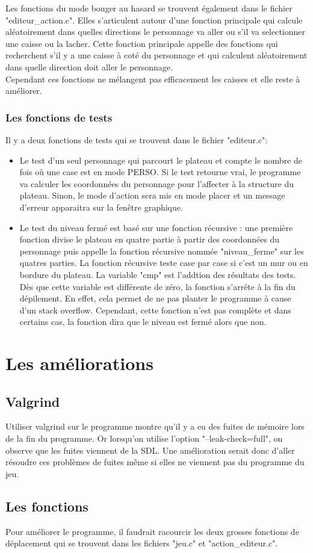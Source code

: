 \documentclass{report}
\begin{document}
Les fonctions du mode bouger au hasard se trouvent également dans le fichier "editeur\_action.c". Elles s'articulent autour d'une fonction principale qui calcule aléatoirement dans quelles directions le personnage va aller ou s'il va selectionner une caisse ou la lacher.
Cette fonction principale appelle des fonctions qui recherchent s'il y a une caisse à coté du personnage et qui calculent aléatoirement dans quelle direction doit aller le personnage.\\
Cependant ces fonctions ne mélangent pas efficacement les caisses et elle reste à améliorer.

		\section{Les fonctions de tests}
Il y a deux fonctions de tests qui se trouvent dans le fichier "editeur.c":\\
\begin{itemize}
\item Le test d'un seul personnage qui parcourt le plateau et compte le nombre de fois où une case est en mode PERSO. Si le test retourne vrai, le programme va calculer les coordonnées du personnage pour l'affecter à la structure du plateau. Sinon, le mode d'action sera mis en mode placer et un message d'erreur apparaitra sur la fenêtre graphique.
\item Le test du niveau fermé est basé sur une fonction récursive : une première fonction divise le plateau en quatre partie à partir des coordonnées du personnage puis appelle la fonction récursive nommée "niveau\_ferme" sur les quatres parties.
La fonction récursive teste case par case si c'est un mur ou en bordure du plateau. La variable "cmp" est l'addtion des résultats des tests. Dès que cette variable est différente de zéro, la fonction s'arrête à la fin du dépilement. En effet, cela permet de ne pas planter le programme à cause d'un stack overflow.
Cependant, cette fonction n'est pas complète et dans certains cas, la fonction dira que le niveau est fermé alors que non.
\end{itemize}

\part{Les améliorations}
	\chapter{Valgrind}
Utiliser valgrind sur le programme montre qu'il y a eu des fuites de mémoire lors de la fin du programme. Or lorsqu'on utilise l'option "--leak-check=full", on observe que les fuites viennent de la SDL. 
Une amélioration serait donc d'aller résoudre ces problèmes de fuites même si elles ne viennent pas du programme du jeu. 
	\chapter{Les fonctions}
Pour améliorer le programme, il faudrait racourcir les deux grosses fonctions de déplacement qui se trouvent dans les fichiers "jeu.c" et "action\_editeur.c". 
\end{document}
